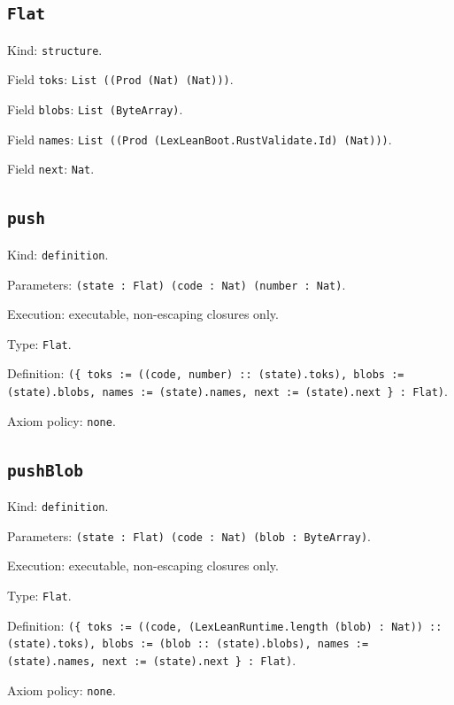 \documentclass[11pt]{article}
\begin{document}
\subsection*{\texttt{Flat}}
\noindent Kind: \texttt{structure}.\par
\noindent Field \texttt{toks}: \texttt{List ((Prod (Nat) (Nat)))}.\par
\noindent Field \texttt{blobs}: \texttt{List (ByteArray)}.\par
\noindent Field \texttt{names}: \texttt{List ((Prod (LexLeanBoot.RustValidate.Id) (Nat)))}.\par
\noindent Field \texttt{next}: \texttt{Nat}.\par
\subsection*{\texttt{push}}
\noindent Kind: \texttt{definition}.\par
\noindent Parameters: \texttt{(state : Flat) (code : Nat) (number : Nat)}.\par
\noindent Execution: executable, non-escaping closures only.\par
\noindent Type: \texttt{Flat}.\par
\noindent Definition: \texttt{(\{ toks := ((code, number) :: (state).toks), blobs := (state).blobs, names := (state).names, next := (state).next \} : Flat)}.\par
\noindent Axiom policy: \texttt{none}.\par
\subsection*{\texttt{pushBlob}}
\noindent Kind: \texttt{definition}.\par
\noindent Parameters: \texttt{(state : Flat) (code : Nat) (blob : ByteArray)}.\par
\noindent Execution: executable, non-escaping closures only.\par
\noindent Type: \texttt{Flat}.\par
\noindent Definition: \texttt{(\{ toks := ((code, (LexLeanRuntime.length (blob) : Nat)) :: (state).toks), blobs := (blob :: (state).blobs), names := (state).names, next := (state).next \} : Flat)}.\par
\noindent Axiom policy: \texttt{none}.\par
\end{document}

